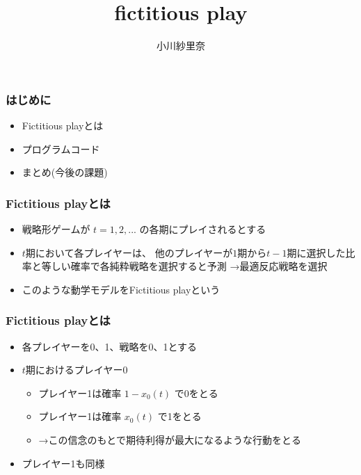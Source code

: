 \documentclass[dvipdfmx,fleqn,handout]{beamer}
\title{\Large fictitious play}
\author{\large 小川紗里奈}
\date{\small }
\begin{document}
\sffamily
\gtfamily


\begin{frame}
  \titlepage
  \thispagestyle{empty}
\end{frame}

\setcounter{framenumber}{0}




\begin{frame}\frametitle{はじめに}
 \begin{itemize}\setlength{\parskip}{0.5em}
  \item
  Fictitious playとは
  \item
  プログラムコード
  \item
  まとめ(今後の課題)
 \end{itemize}
\end{frame}



\begin{frame}\frametitle{Fictitious playとは}
 \begin{itemize}\setlength{\parskip}{0.5em}
  \item
  戦略形ゲームが $t=1,2,...$ の各期にプレイされるとする
  \item
  $t$期において各プレイヤーは、
  他のプレイヤーが$1$期から$t-1$期に選択した比率と等しい確率で各純粋戦略を選択すると予測
  →最適反応戦略を選択
  \item
  このような動学モデルをFictitious playという
 \end{itemize}
\end{frame}


\begin{frame}\frametitle{Fictitious playとは}
 \begin{itemize}\setlength{\parskip}{0.5em}
  \item
  各プレイヤーを0、1、戦略を0、1とする
  \item
  $t$期におけるプレイヤー0
   \begin{itemize}\setlength{\parskip}{0.5em}
    \item
    プレイヤー1は確率 $1-x_{0}(t)$ で0をとる
    \item
    プレイヤー1は確率 $x_{0}(t)$ で1をとる
    \item
    →この信念のもとで期待利得が最大になるような行動をとる
   \end{itemize}
  \item
  プレイヤー1も同様
 \end{itemize}
\end{frame}
\end{document}
